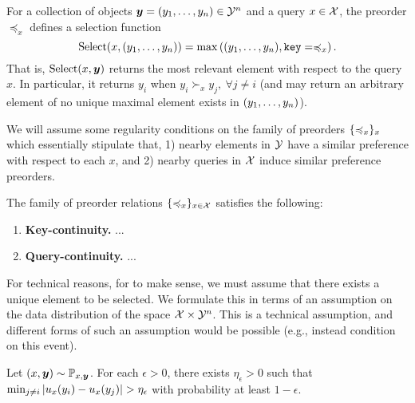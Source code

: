 For a collection of objects $\bm{y} = (y_1, \ldots, y_n) \in {\mathcal{Y}}^n$ and a query $x \in {\mathcal{X}}$, the preorder $\preceq_x$ defines a selection function
\begin{equation}\label{eq:def_selection}
  \mathrm{Select}(x, (y_1, \ldots, y_n)) = \max\left((y_1, \ldots, y_n), \mathtt{key}=\preccurlyeq_x\right).
\end{equation}
That is, $\mathrm{Select}(x, \bm{y})$ returns the most relevant element with respect to the query $x$. In particular, it returns $y_i$ when $y_i \succ_x y_j, \ \forall j \neq i$ (and may return an arbitrary element of no unique maximal element exists in $(y_1, \ldots, y_n)$).

We will assume some regularity conditions on the family of preorders $\{\preccurlyeq_x\}_x$ which essentially stipulate that, 1) nearby elements in ${\mathcal{Y}}$ have a similar preference with respect to each $x$, and 2) nearby queries in ${\mathcal{X}}$ induce similar preference preorders.

\begin{assumption}\label{ass:qk_cts}
  The family of preorder relations $\{\preccurlyeq_x\}_{x \in {\mathcal{X}}}$ satisfies the following:
  \begin{enumerate}
    \item \textbf{Key-continuity.} ...
    \item \textbf{Query-continuity.} ...
  \end{enumerate}
\end{assumption}

For technical reasons, for  to make sense, we must assume that there exists a unique element to be selected. We formulate this in terms of an assumption on the data distribution of the space ${\mathcal{X}} \times {\mathcal{Y}}^n$. This is a technical assumption, and different forms of such an assumption would be possible (e.g., instead condition on this event).
\begin{assumption}\label{ass:select_unique}
  Let $(x, \bm{y}) \sim {\mathbb{P}}_{x,\bm{y}}$. For each $\epsilon > 0$, there exists $\eta_\epsilon > 0$ such that $\min_{j \neq i} \left\lvert u_x(y_i) - u_x(y_j)\right\rvert > \eta_\epsilon$ with probability at least $1 - \epsilon$.
\end{assumption}



